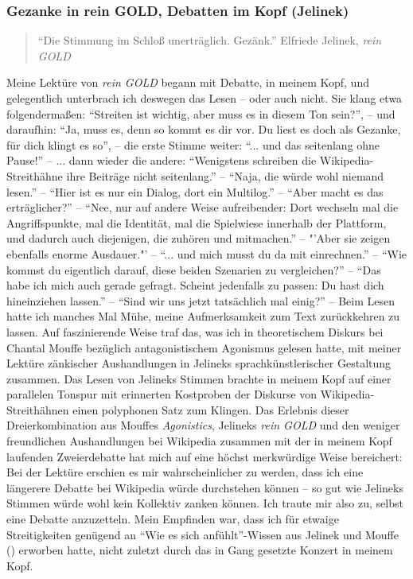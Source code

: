 \documentclass[fontsize=12pt]{scrartcl}
\begin{document}
\newpage

\subsubsection{Gezanke in \flq rein GOLD\frq, Debatten im Kopf (Jelinek)}
\label{subsubsec:5.4.4}

\singlespacing
\begin{quote}
{\footnotesize "`Die Stimmung im Schlo{\ss} unertr\"aglich. Gez\"ank."' Elfriede Jelinek, \textit{rein GOLD}}
\end{quote}

\onehalfspacing

Meine Lekt\"ure von \textit{rein GOLD} begann mit Debatte, in meinem Kopf, und gelegentlich unterbrach ich deswegen das Lesen -- oder auch nicht. Sie klang etwa folgenderma{\ss}en: "`Strei\-ten ist wichtig, aber muss es in diesem Ton sein?"', -- und daraufhin: "`Ja, muss es, denn so kommt es dir vor. Du liest es doch als Gezanke, f\"ur dich klingt es so"', -- die erste Stimme weiter: "`... und das sei\-tenlang ohne Pause!"' -- ... dann wieder die andere: "`Wenigstens schrei\-ben die Wi\-ki\-pe\-dia-Streith\"ahne ihre Beitr\"age nicht sei\-tenlang."' -- "`Naja, die w\"urde wohl niemand lesen."' -- "`\mbox{Hier} ist es nur ein Dialog, dort ein Multilog."' -- "`Aber macht es das ertr\"aglicher?"' -- "`Nee, nur auf andere Weise aufreibender: Dort wechseln mal die Angriffspunkte, mal die Identit\"at, mal die Spielwiese innerhalb der Plattform, und dadurch auch diejenigen, die zuh\"oren und mitmachen."' -- "'Aber sie zeigen ebenfalls enorme Ausdauer."' -- "`... und mich musst du da mit einrechnen."' -- "`Wie kommst du eigentlich darauf, diese beiden Szenarien zu vergleichen?"' -- "`Das habe ich mich auch gerade gefragt. Scheint jedenfalls zu passen: Du hast dich hineinziehen lassen."' -- "`Sind wir uns jetzt tats\"achlich mal einig?"' -- Beim Lesen hatte ich manches Mal M\"uhe, meine Aufmerksamkeit zum Text zur\"uckkehren zu lassen. Auf faszinierende Weise traf das, was ich in theo\-retischem Diskurs bei Chantal Mouffe bez\"uglich an\-ta\-go\-nis\-ti\-schem Agonismus gelesen hatte, mit meiner Lekt\"ure z\"ankischer Aushandlungen in Jelineks sprachk\"unstlerischer Gestaltung zusammen. Das Lesen von Jelineks Stimmen brachte in meinem Kopf auf einer parallelen Tonspur mit erinnerten Kostproben der Diskurse von Wi\-ki\-pe\-dia-Streith\"ahnen einen polyphonen Satz zum Klingen. Das Erlebnis dieser Dreierkombination aus Mouffes \textit{Agonistics}, Jelineks \textit{rein GOLD} und den we\-ni\-ger freund\-lichen Aus\-handlungen bei Wi\-ki\-pe\-dia zusammen mit der in meinem Kopf laufenden Zweierdebatte hat mich auf eine h\"ochst merkw\"urdige Weise be\-rei\-chert: Bei der Lekt\"ure erschien es mir wahrscheinlicher zu werden, dass ich eine l\"angerere Debatte bei Wi\-ki\-pe\-dia w\"urde durchstehen k\"onnen -- so gut wie Jelineks Stimmen w\"urde wohl kein Kollektiv zanken k\"onnen. Ich traute mir also zu, \mbox{selbst} eine Debatte anzuzetteln. Mein Empfinden war, dass ich f\"ur etwaige Streitigkei\-ten gen\"ugend an "`Wie es sich anf\"uhlt"'-Wissen aus Jelinek und Mouffe (\cite{Mouffe2013}) erworben hatte, nicht zu\-letzt durch das in Gang gesetzte Konzert in meinem Kopf.
\end{document}
